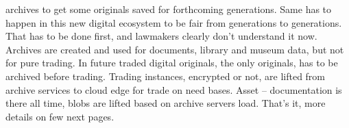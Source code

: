 archives to get some originals saved for forthcoming generations. Same has to happen in this new digital ecosystem to be fair from generations to generations. That has to be done first, and lawmakers clearly don't understand it now. Archives are created and used for documents, library and museum data, but not for pure trading. In future traded digital originals, the only originals, has to be archived before trading. Trading instances, encrypted or not, are lifted from archive services to cloud edge for trade on need bases. Asset -- documentation is there all time, blobs are lifted based on archive servers load. That's it, more details on few next pages.
